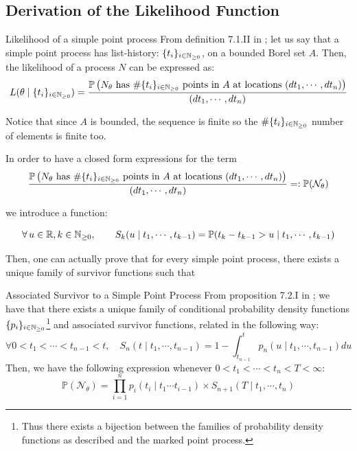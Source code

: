\subsection{Derivation of the Likelihood Function}
\begin{theoreme}{Likelihood of a simple point process}
From definition 7.1.II in \cite{daley}; let us say that a simple point process has list-history: $\{  t_i  \}_{ i \in \mathbb{N}_{\geq 0}}$, on a bounded Borel set $A$. Then, the likelihood of a process $N$ can be expressed as:
\begin{equation}
L( \theta \mid \{ t_i \}_{ i \in \mathbb{N}_{\geq 0}} ) =  \frac{\mathbb P \left (N_{\theta}  \text{ has } \# \{ t_i \}_{ i \in \mathbb{N}_{\geq 0}} \text{ points in } A \text{ at locations  } (d t_1, \cdots, d t_n) \right ) } {(d t_1, \cdots, d t_n)}
\end{equation}

Notice that since $A$ is bounded, the sequence is finite so the $\#\{ t_i \}_{ i \in \mathbb{N}_{\geq 0}}$ number of elements is finite too. 
\end{theoreme}




In order to have a closed form expressions for the term $$\frac{\mathbb P \left (N_{\theta}  \text{ has } \# \{ t_i \}_{ i \in \mathbb{N}_{\geq 0}} \text{ points in } A \text{ at locations  } (d t_1, \cdots, d t_n) \right ) } {(d t_1, \cdots, d t_n)}  =: \mathbb P ( \mathcal N_{\theta} ) $$

we introduce a function:
\begin{definition}
\begin{equation}
\forall u \in \R, k \in \N, \qquad S_k ( u \mid t_1, \cdots, t_{k-1} ) = \mathbb P ( t_k - t_{k-1} > u \mid t_1, \cdots, t_{k-1} ) 
\end{equation}
\end{definition}



Then, one can actually prove that for every simple point process, there exists a unique family of survivor functions such that

\begin{theoreme}{Associated Survivor to a Simple Point Process}
From proposition 7.2.I in \cite{daley}; we have that there exists a unique family of conditional probability density functions $\{ p_i \}_{ i \in \mathbb{N}_{\geq 0}}$\footnote{Thus there exists a bijection between the families of probability density functions as described and the marked point process.} and associated survivor functions, related in the following way:
\begin{equation}
\forall 0 < t_1 < \cdots < t_{n-1} < t, \quad S_n( t \mid t_1, \cdots, t_{n-1} ) = 1 - \int_{t_{n-1}}^t p_n ( u \mid t_1, \cdots, t_{n-1} ) du
\end{equation}
Then, we have the following expression whenever $0 < t_1 < \cdots < t_{n} < T < \infty $:
\begin{equation}
\mathbb P ( \mathcal N_{\theta} )  =   \prod_{i = 1}^n p_i ( t_i \mid t_1 \cdots t_{i-1} ) \times S_{n+1} ( T \mid t_1, \cdots, t_n )  
\end{equation}
\end{theoreme}


